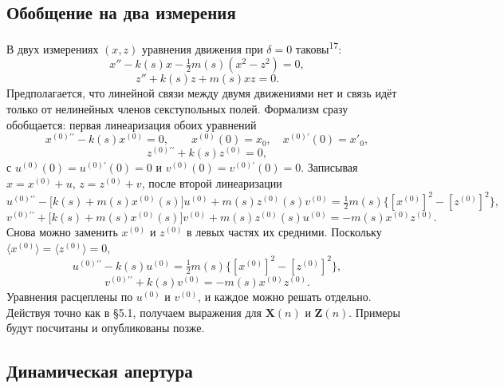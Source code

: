 \documentclass[11pt,a4paper]{article}
\begin{document}
\subsection{Обобщение на два измерения}

В двух измерениях $(x,z)$ уравнения движения при $\delta=0$ таковы\textsuperscript{17}:
\begin{equation}
x''-k(s)x-\tfrac12 m(s)(x^2-z^2)=0,
\end{equation}
\begin{equation}
z''+k(s)z+m(s)xz=0.
\end{equation}
Предполагается, что линейной связи между двумя движениями нет и связь идёт
только от нелинейных членов секступольных полей. Формализм сразу обобщается:
первая линеаризация обоих уравнений
\begin{equation}
x^{(0)\prime\prime}-k(s)x^{(0)}=0,\qquad
x^{(0)}(0)=x_0,\quad x^{(0)\prime}(0)=x'_0,
\end{equation}
\begin{equation}
z^{(0)\prime\prime}+k(s)z^{(0)}=0,
\end{equation}
с $u^{(0)}(0)=u^{(0)\prime}(0)=0$ и $v^{(0)}(0)=v^{(0)\prime}(0)=0$. Записывая
$x=x^{(0)}+u$, $z=z^{(0)}+v$, после второй линеаризации
\begin{equation}
u^{(0)\prime\prime}-\bigl[k(s)+m(s)x^{(0)}(s)\bigr]u^{(0)}
+m(s)z^{(0)}(s)v^{(0)}
=\tfrac12 m(s)\bigl\{[x^{(0)}]^2-[z^{(0)}]^2\bigr\},
\end{equation}
\begin{equation}
v^{(0)\prime\prime}+\bigl[k(s)+m(s)x^{(0)}(s)\bigr]v^{(0)}
+m(s)z^{(0)}(s)u^{(0)}
=-m(s)x^{(0)}z^{(0)}.
\end{equation}
Снова можно заменить $x^{(0)}$ и $z^{(0)}$ в левых частях их средними. Поскольку
$\langle x^{(0)}\rangle=\langle z^{(0)}\rangle=0$,
\begin{equation}
u^{(0)\prime\prime}-k(s)u^{(0)}=\tfrac12 m(s)\bigl\{[x^{(0)}]^2-[z^{(0)}]^2\bigr\},
\end{equation}
\begin{equation}
v^{(0)\prime\prime}+k(s)v^{(0)}=-m(s)x^{(0)}z^{(0)}.
\end{equation}
Уравнения расцеплены по $u^{(0)}$ и $v^{(0)}$, и каждое можно решать отдельно.
Действуя точно как в §5.1, получаем выражения для $\mathbf{X}(n)$ и
$\mathbf{Z}(n)$. Примеры будут посчитаны и опубликованы позже.

\subsection{Динамическая апертура}
\end{document}
